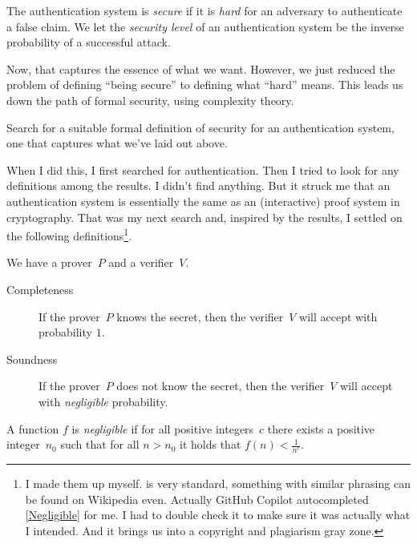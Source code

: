 \begin{frame}
\begin{definition}
  The authentication system is \emph{secure} if it is \emph{hard} for an 
  adversary to authenticate a false claim.
  We let the \emph{security level} of an authentication system be the inverse 
  probability of a successful attack.
\end{definition}
\end{frame}

Now, that captures the essence of what we want.
However, we just reduced the problem of defining \enquote{being secure} to 
defining what \enquote{hard} means.
This leads us down the path of formal security, \eg using complexity theory.

\begin{exercise}
  Search for a suitable formal definition of security for an authentication 
  system, one that captures what we've laid out above.
\end{exercise}

When I did this, I first searched for authentication.
Then I tried to look for any definitions among the results.
I didn't find anything.
But it struck me that an authentication system is essentially the same as an 
(interactive) proof system in cryptography.
That was my next search and, inspired by the results, I settled on the 
following definitions\footnote{%
   I made them up myself.
   is very standard, something with similar phrasing can be 
  found on Wikipedia even.
  Actually GitHub Copilot autocompleted \cref{Negligible} for me.
  I had to double check it to make sure it was actually what I intended.
  And it brings us into a copyright and plagiarism gray zone.
}.

\begin{frame}
\begin{definition}\label{FormalSecurity}
  We have a prover~\(P\) and a verifier~\(V\).
  \begin{description}
    \item[Completeness] If the prover~\(P\) knows the secret, then the 
      verifier~\(V\) will accept with probability \(1\).
    \item[Soundness] If the prover~\(P\) does not know the secret, then the 
      verifier~\(V\) will accept with \emph{negligible} probability.
  \end{description}
\end{definition}

\begin{definition}[Negligible]\label{Negligible}
  A function \(f\) is \emph{negligible} if for all positive integers~\(c\) 
  there exists a positive integer~\(n_0\) such that for all \(n > n_0\) it 
  holds that \(f(n) < \frac{1}{n^c}\).
\end{definition}
\end{frame}

